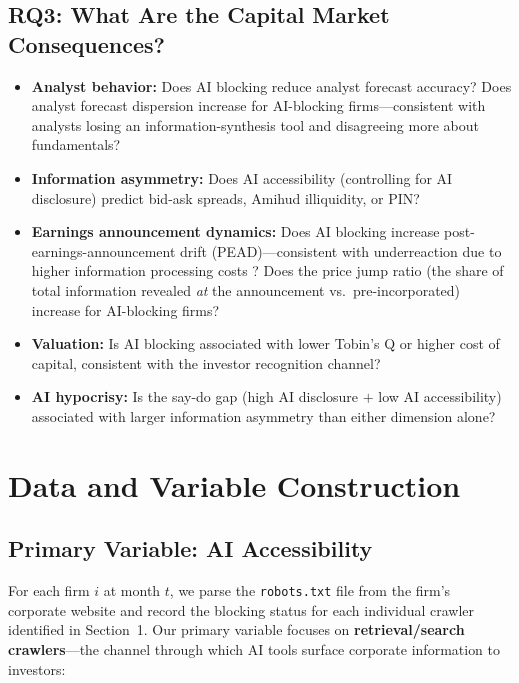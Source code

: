 \documentclass[12pt,a4paper]{article}
\begin{document}
\subsection{RQ3: What Are the Capital Market Consequences?}
\label{sec:rq3}

\begin{itemize}
    \item \textbf{Analyst behavior:} Does AI blocking reduce analyst forecast accuracy? Does analyst forecast dispersion increase for AI-blocking firms---consistent with analysts losing an information-synthesis tool and disagreeing more about fundamentals?
    \item \textbf{Information asymmetry:} Does AI accessibility (controlling for AI disclosure) predict bid-ask spreads, Amihud illiquidity, or PIN?
    \item \textbf{Earnings announcement dynamics:} Does AI blocking increase post-earnings-announcement drift (PEAD)---consistent with underreaction due to higher information processing costs \citep[cf.][]{ChenKellyWu2020}? Does the price jump ratio (the share of total information revealed \emph{at} the announcement vs.\ pre-incorporated) increase for AI-blocking firms?
    \item \textbf{Valuation:} Is AI blocking associated with lower Tobin's Q or higher cost of capital, consistent with the \citet{Merton1987} investor recognition channel?
    \item \textbf{AI hypocrisy:} Is the say-do gap (high AI disclosure $+$ low AI accessibility) associated with larger information asymmetry than either dimension alone?
\end{itemize}

\section{Data and Variable Construction}

\subsection{Primary Variable: AI Accessibility}

For each firm $i$ at month $t$, we parse the \texttt{robots.txt} file from the firm's corporate website and record the blocking status for each individual crawler identified in Section~1. Our primary variable focuses on \textbf{retrieval/search crawlers}---the channel through which AI tools surface corporate information to investors:
\end{document}
